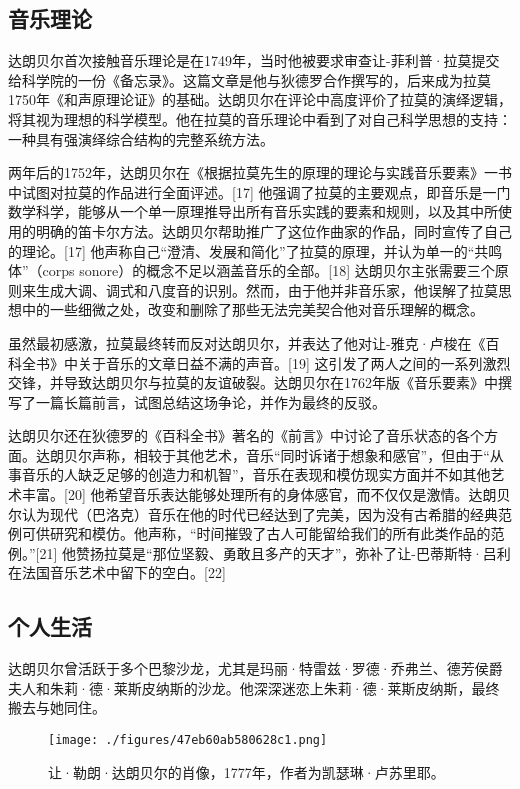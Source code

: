 \subsection{音乐理论}
达朗贝尔首次接触音乐理论是在1749年，当时他被要求审查让-菲利普·拉莫提交给科学院的一份《备忘录》。这篇文章是他与狄德罗合作撰写的，后来成为拉莫1750年《和声原理论证》的基础。达朗贝尔在评论中高度评价了拉莫的演绎逻辑，将其视为理想的科学模型。他在拉莫的音乐理论中看到了对自己科学思想的支持：一种具有强演绎综合结构的完整系统方法。

两年后的1752年，达朗贝尔在《根据拉莫先生的原理的理论与实践音乐要素》一书中试图对拉莫的作品进行全面评述。[17] 他强调了拉莫的主要观点，即音乐是一门数学科学，能够从一个单一原理推导出所有音乐实践的要素和规则，以及其中所使用的明确的笛卡尔方法。达朗贝尔帮助推广了这位作曲家的作品，同时宣传了自己的理论。[17] 他声称自己“澄清、发展和简化”了拉莫的原理，并认为单一的“共鸣体”（corps sonore）的概念不足以涵盖音乐的全部。[18] 达朗贝尔主张需要三个原则来生成大调、调式和八度音的识别。然而，由于他并非音乐家，他误解了拉莫思想中的一些细微之处，改变和删除了那些无法完美契合他对音乐理解的概念。

虽然最初感激，拉莫最终转而反对达朗贝尔，并表达了他对让-雅克·卢梭在《百科全书》中关于音乐的文章日益不满的声音。[19] 这引发了两人之间的一系列激烈交锋，并导致达朗贝尔与拉莫的友谊破裂。达朗贝尔在1762年版《音乐要素》中撰写了一篇长篇前言，试图总结这场争论，并作为最终的反驳。

达朗贝尔还在狄德罗的《百科全书》著名的《前言》中讨论了音乐状态的各个方面。达朗贝尔声称，相较于其他艺术，音乐“同时诉诸于想象和感官”，但由于“从事音乐的人缺乏足够的创造力和机智”，音乐在表现和模仿现实方面并不如其他艺术丰富。[20] 他希望音乐表达能够处理所有的身体感官，而不仅仅是激情。达朗贝尔认为现代（巴洛克）音乐在他的时代已经达到了完美，因为没有古希腊的经典范例可供研究和模仿。他声称，“时间摧毁了古人可能留给我们的所有此类作品的范例。”[21] 他赞扬拉莫是“那位坚毅、勇敢且多产的天才”，弥补了让-巴蒂斯特·吕利在法国音乐艺术中留下的空白。[22]
\subsection{个人生活}
达朗贝尔曾活跃于多个巴黎沙龙，尤其是玛丽·特雷兹·罗德·乔弗兰、德芳侯爵夫人和朱莉·德·莱斯皮纳斯的沙龙。他深深迷恋上朱莉·德·莱斯皮纳斯，最终搬去与她同住。
\begin{figure}[ht]
\centering
\texttt{[image: ./figures/47eb60ab580628c1.png]}
\caption{让·勒朗·达朗贝尔的肖像，1777年，作者为凯瑟琳·卢苏里耶。} \label{fig_BR_4}
\end{figure}
